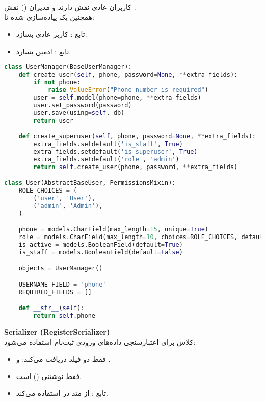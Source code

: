 \documentclass{report}
\begin{document}
کاربران عادی نقش  دارند و مدیران () نقش . \\
همچنین یک  پیاده‌سازی شده تا:
\begin{itemize}
  \item تابع : کاربر عادی بسازد.
  \item تابع : ادمین بسازد.
\end{itemize}
\begin{lstlisting}[language=python]
class UserManager(BaseUserManager):
    def create_user(self, phone, password=None, **extra_fields):
        if not phone:
            raise ValueError("Phone number is required")
        user = self.model(phone=phone, **extra_fields)
        user.set_password(password)
        user.save(using=self._db)
        return user

    def create_superuser(self, phone, password=None, **extra_fields):
        extra_fields.setdefault('is_staff', True)
        extra_fields.setdefault('is_superuser', True)
        extra_fields.setdefault('role', 'admin')
        return self.create_user(phone, password, **extra_fields)

class User(AbstractBaseUser, PermissionsMixin):
    ROLE_CHOICES = (
        ('user', 'User'),
        ('admin', 'Admin'),
    )

    phone = models.CharField(max_length=15, unique=True)
    role = models.CharField(max_length=10, choices=ROLE_CHOICES, default='user')
    is_active = models.BooleanField(default=True)
    is_staff = models.BooleanField(default=False)

    objects = UserManager()

    USERNAME_FIELD = 'phone'
    REQUIRED_FIELDS = []

    def __str__(self):
        return self.phone

\end{lstlisting}
\textbf{Serializer (RegisterSerializer)} \\
کلاس  برای اعتبارسنجی داده‌های ورودی ثبت‌نام استفاده می‌شود:
\begin{itemize}
  \item فقط دو فیلد دریافت می‌کند:  و .
  \item {} فقط نوشتنی () است.
  \item تابع : از متد  در  استفاده می‌کند.
\end{itemize}
\end{document}
